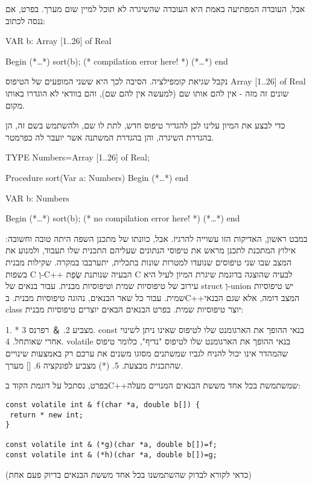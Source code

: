       אבל, העובדה המפתיעה באמת היא העובדה שהשיגרה לא תוכל למיין שום מערך. בפרט, אם ננסה לכתוב:

      VAR
      b: Array [1..26] of Real

      Begin
      (*…*)
      sort(b); (* compilation error here! *)
      (*…*)
      end

      נקבל שגיאת קומפילציה. הסיבה לכך היא ששני המופעים של הטיפוס Array [1..26] of Real שונים זה מזה - אין להם אותו שם (למעשה אין להם שם), והם בוודאי לא הוגדרו באותו מקום.

      כדי לבצע את המיון עלינו לכן להגדיר טיפוס חדש, לתת לו שם, ולהשתמש בשם זה, הן בהגדרת השיגרה, והן בהגדרת המשתנה אשר יועבר לה כפרמטר.

      TYPE
      Numbers=Array [1..26] of Real;

      Procedure sort(Var a: Numbers)
      Begin
      (*…*)
      end

      VAR
      b: Numbers

      Begin
      (*…*)
      sort(b); (* no compilation error here! *)
      (*…*)
      end

      במבט ראשון, האדיקות הזו עשוייה להרגיז. אבל, כוונתו של מתכנן השפה היתה טובה וחשובה: אילוץ המתכנת לתכנן מראש את טיפוסי הנתונים שעליהם התכנית שלו תעבוד, ולמנוע את המצב שבו שני טיפוסים שנועדו למטרות שונות בתכלית, יתערבבו במקרה.
      שקילות מבנית בשפות C וְ-C++
      הבעיה שנותנת שְׂפַת C לבעיה שהוצגה בדוגמת שיגרת המיון לעיל היא עירוב של טיפוסיות שמית וטיפוסיות מבנית. עבור בנאים של struct וְ-union יש טיפוסיות שמית. עבור כל שאר הבנאים, נהוגה טיפוסיות מבנית. בC++המצב דומה, אלא שגם הבנאי class יוצר טיפוסיות שמית. בפרט הבנאים הבאים יוצרים טיפוסיות מבנית:

      1. * מצביע
      2. ＆ רפרנס
      3. const בנאי ההופך את הארגומנט שלו לטיפוס שאינו ניתן לשינוי אחרי שאותחל.
      4. volatile בנאי ההופך את הארגומנט שלו לטיפוס "נדיף", כלומר טיפוס שהמהדר אינו יכול להניח לגביו שמשתנים מסוגו משנים את ערכם רק באמצעות שינויים שהתכנית מבצעת.
      5. (*) מצביע לפונקציה
      6. [] מערך.

      בפרט, נסתכל על דוגמת הקוד בC++שמשתמשת בכל אחד מששת הבנאים המנויים מעלה:

\begin{verbatim}
const volatile int & f(char *a, double b[]) {
 return * new int;
}

const volatile int & (*g)(char *a, double b[])=f;
const volatile int & (*h)(char *a, double b[])=g;
\end{verbatim}

      (כדאי לקורא לבדוק שהשתמשנו בכל אחד מששת הבנאים בדיוק פעם אחת)

